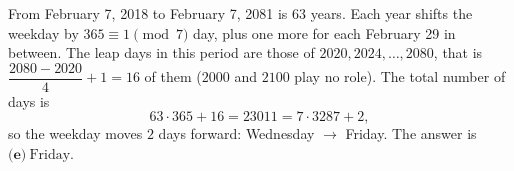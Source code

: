 From February 7, 2018 to February 7, 2081 is $63$ years. Each year shifts the weekday by $365\equiv1\pmod7$ day, plus one more for each February 29 in between. The leap days in this period are those of $2020,2024,\dots,2080$, that is $\dfrac{2080-2020}{4}+1=16$ of them ($2000$ and $2100$ play no role). The total number of days is
\[
63\cdot365+16=23011=7\cdot3287+2,
\]
so the weekday moves $2$ days forward: Wednesday $\to$ Friday. The answer is $\boxed{\textbf{(e)}\ \text{Friday}}$.
